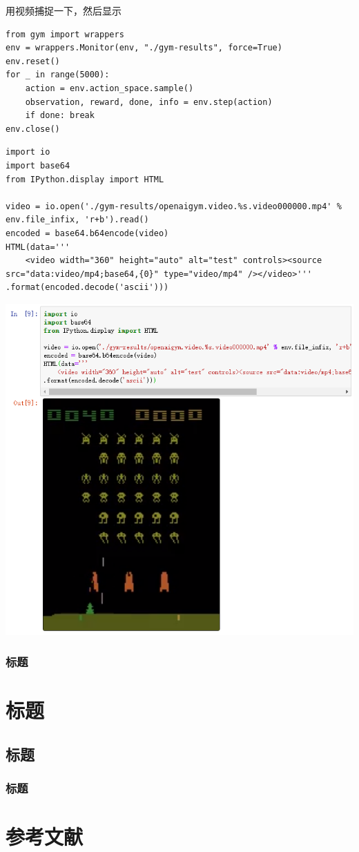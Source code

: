 \documentclass[fontset=windows,openany,UTF8]{ctexbook}
\begin{document}
用视频捕捉一下，然后显示

\lstset{language=python}
\begin{lstlisting}
from gym import wrappers
env = wrappers.Monitor(env, "./gym-results", force=True)
env.reset()
for _ in range(5000):
    action = env.action_space.sample()
    observation, reward, done, info = env.step(action)
    if done: break
env.close()
\end{lstlisting}

\lstset{language=python}
\begin{lstlisting}
import io
import base64
from IPython.display import HTML

video = io.open('./gym-results/openaigym.video.%s.video000000.mp4' % env.file_infix, 'r+b').read()
encoded = base64.b64encode(video)
HTML(data='''
    <video width="360" height="auto" alt="test" controls><source src="data:video/mp4;base64,{0}" type="video/mp4" /></video>'''
.format(encoded.decode('ascii')))
\end{lstlisting}

\includegraphics[scale=0.5]{./assets/rl_game.png}  

\subsection{标题}

\chapter{标题}
\section{标题}

\subsection{标题}


\chapter*{参考文献}
\end{document}
